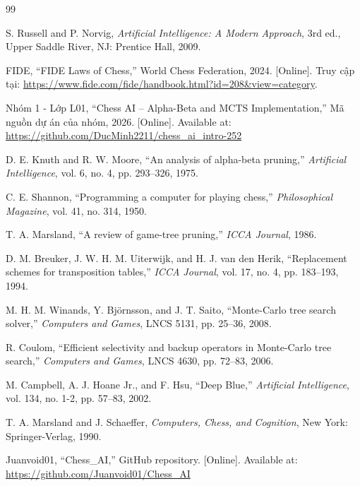 \documentclass[12pt, a4paper]{report}
\theoremstyle{definition}
\begin{document}

% 
\begin{thebibliography}{99}

S. Russell and P. Norvig, \textit{Artificial Intelligence: A Modern Approach}, 3rd ed., Upper Saddle River, NJ: Prentice Hall, 2009.

FIDE, ``FIDE Laws of Chess,'' World Chess Federation, 2024. [Online]. Truy cập tại: \url{https://www.fide.com/fide/handbook.html?id=208&view=category}.

Nhóm 1 - Lớp L01, ``Chess AI – Alpha-Beta and MCTS Implementation,'' Mã nguồn dự án của nhóm, 2026. [Online]. Available at: \url{https://github.com/DucMinh2211/chess_ai_intro-252}

D. E. Knuth and R. W. Moore, ``An analysis of alpha-beta pruning,'' \textit{Artificial Intelligence}, vol. 6, no. 4, pp. 293–326, 1975.

C. E. Shannon, ``Programming a computer for playing chess,'' \textit{Philosophical Magazine}, vol. 41, no. 314, 1950.

T. A. Marsland, ``A review of game-tree pruning,'' \textit{ICCA Journal}, 1986.

D. M. Breuker, J. W. H. M. Uiterwijk, and H. J. van den Herik, ``Replacement schemes for transposition tables,'' \textit{ICCA Journal}, vol. 17, no. 4, pp. 183–193, 1994.

M. H. M. Winands, Y. Björnsson, and J. T. Saito, ``Monte-Carlo tree search solver,'' \textit{Computers and Games}, LNCS 5131, pp. 25–36, 2008.

R. Coulom, ``Efficient selectivity and backup operators in Monte-Carlo tree search,'' \textit{Computers and Games}, LNCS 4630, pp. 72–83, 2006.

M. Campbell, A. J. Hoane Jr., and F. Hsu, ``Deep Blue,'' \textit{Artificial Intelligence}, vol. 134, no. 1-2, pp. 57–83, 2002.

T. A. Marsland and J. Schaeffer, \textit{Computers, Chess, and Cognition}, New York: Springer-Verlag, 1990.

Juanvoid01, ``Chess\_AI,'' GitHub repository. [Online]. Available at: \url{https://github.com/Juanvoid01/Chess_AI}

\end{thebibliography}
\end{document}
